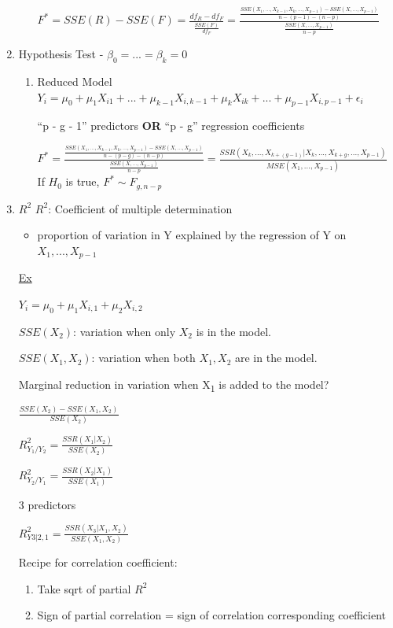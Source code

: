 \documentclass[11pt]{article}
\begin{document}
\begin{enumerate}
\begin{enumerate}
\(F^* = SSE(R) - SSE(F) = \frac{df_R - df_F}{\frac{SSE(F)}{df_F}} = \frac{
\frac{SSE(X_1, ..., X_{k - 1}, X_k, ..., X_{p - 1}) - SSE(X, ..., X_{p -
1})}{n - (p - 1) - (n - p)}}{\frac{SSE(X, ..., X_{p - 1})}{n - p}}\)
\end{enumerate}


\item Hypothesis Test - \(\beta_0 = ... = \beta_k = 0\)
\label{sec:org37b3fbb}
\begin{enumerate}
\item Reduced Model
\label{sec:orgf640c3c}
\(Y_i = \mu_0 + \mu_1 X_{i1} + ... + \mu_{k - 1} X_{i,k - 1} + \mu_k X_{ik} + ... + \mu_{p - 1} X_{i, p - 1} + \epsilon_i\)

``p - g - 1'' predictors \textbf{OR} ``p - g'' regression coefficients

\(F^* = \frac{\frac{SSE(X_1, ..., X_{k - 1}, X_k, ..., X_{p - 1}) - SSE(X, ..., X_{p -
1})}{n - (p - g) - (n - p)}}{\frac{SSE(X, ..., X_{p - 1})}{n - p}} = \frac{SSR(X_k, ..., X_{k + (g - 1)} |
X_k, ..., X_{k + g}, ..., X_{p - 1})}{MSE(X_1, ..., X_{p - 1})}\)
If \(H_0\) is true, \(F^* \sim F_{g, n - p}\)
\end{enumerate}
\item \(R^2\)
\label{sec:org27215d4}
\(R^2\): Coefficient of multiple determination
\begin{itemize}
\item proportion of variation in Y explained by the regression of Y on \(X_1, ...,
  X_{p - 1}\)
\end{itemize}

\uline{Ex}

\(Y_i = \mu_0 + \mu_1 X_{i,1} + \mu_2 X_{i,2}\)

\(SSE(X_2)\): variation when only \(X_2\) is in the model.

\(SSE(X_1, X_2)\): variation when both \(X_1,X_2\) are in the model.

Marginal reduction in variation when X\textsubscript{1} is added to the model?

\(\frac{SSE(X_2) - SSE(X_1, X_2)}{SSE(X_2)}\)

\(R_{Y_1/Y_2}^2 = \frac{SSR(X_1 | X_2)}{SSE(X_2)}\)

\(R_{Y_2/Y_1}^2 = \frac{SSR(X_2 | X_1)}{SSE(X_1)}\)

3 predictors

\(R_{Y3|2,1}^2 = \frac{SSR(X_3 | X_1, X_2)}{SSE(X_1, X_2)}\)

Recipe for correlation coefficient:
\begin{enumerate}
\item Take sqrt of partial \(R^2\)
\item Sign of partial correlation = sign of correlation corresponding coefficient
\end{enumerate}
\end{enumerate}
\end{document}
